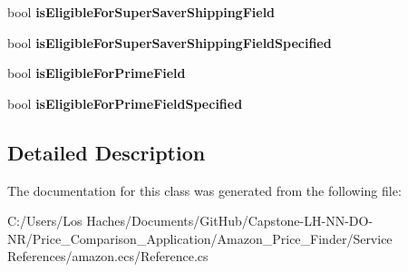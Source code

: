 \begin{DoxyCompactItemize}
\item 
\hypertarget{class_price___comparison_1_1amazon_1_1ecs_1_1_offer_listing_a7c1fdc0d73b1603fa0939d899938560b}{bool {\bfseries is\-Eligible\-For\-Super\-Saver\-Shipping\-Field}}\label{class_price___comparison_1_1amazon_1_1ecs_1_1_offer_listing_a7c1fdc0d73b1603fa0939d899938560b}

\item 
\hypertarget{class_price___comparison_1_1amazon_1_1ecs_1_1_offer_listing_a521f403f20b54bb899fb21791222b513}{bool {\bfseries is\-Eligible\-For\-Super\-Saver\-Shipping\-Field\-Specified}}\label{class_price___comparison_1_1amazon_1_1ecs_1_1_offer_listing_a521f403f20b54bb899fb21791222b513}

\item 
\hypertarget{class_price___comparison_1_1amazon_1_1ecs_1_1_offer_listing_a9994bf6496350f7edb2f16309fac4b19}{bool {\bfseries is\-Eligible\-For\-Prime\-Field}}\label{class_price___comparison_1_1amazon_1_1ecs_1_1_offer_listing_a9994bf6496350f7edb2f16309fac4b19}

\item 
\hypertarget{class_price___comparison_1_1amazon_1_1ecs_1_1_offer_listing_a654ea99fc86151b5a6979bd6de2b0711}{bool {\bfseries is\-Eligible\-For\-Prime\-Field\-Specified}}\label{class_price___comparison_1_1amazon_1_1ecs_1_1_offer_listing_a654ea99fc86151b5a6979bd6de2b0711}

\end{DoxyCompactItemize}


\subsection{Detailed Description}


The documentation for this class was generated from the following file\-:\begin{DoxyCompactItemize}
\item 
C\-:/\-Users/\-Los Haches/\-Documents/\-Git\-Hub/\-Capstone-\/\-L\-H-\/\-N\-N-\/\-D\-O-\/\-N\-R/\-Price\-\_\-\-Comparison\-\_\-\-Application/\-Amazon\-\_\-\-Price\-\_\-\-Finder/\-Service References/amazon.\-ecs/Reference.\-cs\end{DoxyCompactItemize}
